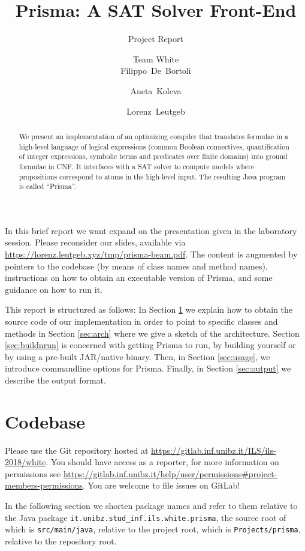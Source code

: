 \documentclass{llncs}
\title{Prisma: A SAT Solver Front-End}
\subtitle{Project Report}
\author{Team White\\[2mm]Filippo~De~Bortoli \and Aneta~Koleva \and Lorenz~Leutgeb}
\institute{Free University of Bozen-Bolzano\\[3mm] \texttt{\{\href{mailto:filippo.debortoli@stud-inf.unibz.it}{filippo.debortoli},\href{mailto:aneta.koleva@stud-inf.unibz.it}{aneta.koleva},\href{mailto:lorenz.leutgeb@stud-inf.unibz.it}{lorenz.leutgeb}\}\newline @stud-inf.unibz.it}}
\begin{document}
  \maketitle

  \begin{abstract}
We present an implementation of an optimizing compiler that translates formulae in a high-level language of logical expressions (common Boolean connectives, quantification of integer expressions, symbolic terms and predicates over finite domains) into ground formulae in CNF. It interfaces with a SAT solver to compute models where propositions correspond to atoms in the high-level input. The resulting Java program is called \enquote{Prisma}.
  \end{abstract}

%
%
%
%
%

In this brief report we want expand on the presentation given in the laboratory session. Please reconsider our slides, available via \url{https://lorenz.leutgeb.xyz/tmp/prisma-beam.pdf}. The content is augmented by pointers to the codebase (by means of class names and method names), instructions on how to obtain an executable version of Prisma, and some guidance on how to run it.

This report is structured as follows: In Section \ref{sec:code} we explain how to obtain the source code of our implementation in order to point to specific classes and methods in Section \ref{sec:arch} where we give a sketch of the architecture. Section \ref{sec:buildnrun} is concerned with getting Prisma to run, by building yourself or by using a pre-built JAR/native binary. Then, in Section \ref{sec:usage}, we introduce commandline options for Prisma. Finally, in Section \ref{sec:output} we describe the output format.

\section{Codebase}
\label{sec:code}

Please use the Git repository hosted at \url{https://gitlab.inf.unibz.it/ILS/ils-2018/white}. You should have access as a reporter, for more information on permissions see \url{https://gitlab.inf.unibz.it/help/user/permissions#project-members-permissions}. You are welcome to file issues on GitLab!

In the following section we shorten package names and refer to them relative to the Java package \texttt{it.unibz.stud\_inf.ils.white.prisma}, the source root of which is \texttt{src/main/java}, relative to the project root, which is \texttt{Projects/prisma}, relative to the repository root.
\end{document}

